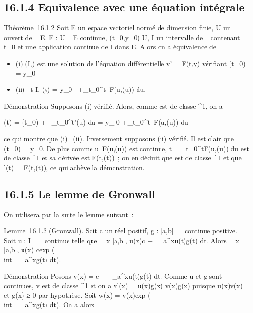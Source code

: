 \documentclass[]{article}
\begin{document}
\subsection{16.1.4 Equivalence avec une équation intégrale}

Théorème~16.1.2 Soit E un espace vectoriel normé de dimension finie, U
un ouvert de ~ \times E, F : U \rightarrow~ E continue, (t_0,y_0) \in U,
I un intervalle de ~ contenant t_0 et \phi une application
continue de I dans E. Alors on a équivalence de

\begin{itemize}
\itemsep1pt\parskip0pt
\item
  (i) (I,\phi) est une solution de l'équation différentielle y' = F(t,y)
  vérifiant \phi(t_0) = y_0
\item
  (ii) \forall~t \in I, \phi(t) = y_0~
  +\int  _t_0^t~F(u,\phi(u))
  du.
\end{itemize}

Démonstration Supposons (i) vérifié. Alors, comme \phi est de classe
^1, on a

\phi(t) = \phi(t_0) +\int ~
_t_0^t\phi'(u) du = y_ 0
+\int  _t_0^t~F(u,\phi(u))
du

ce qui montre que (i) \rigtharrow~(ii). Inversement supposons (ii) vérifié. Il est
clair que \phi(t_0) = y_0. De plus comme
u\mapsto~F(u,\phi(u)) est continue,
t\mapsto~\int ~
_t_0^tF(u,\phi(u)) du est de classe ^1
et sa dérivée est F(t,\phi(t))~; on en déduit que \phi est de classe
^1 et que \phi'(t) = F(t,\phi(t)), ce qui achève la démonstration.

\subsection{16.1.5 Le lemme de Gronwall}

On utilisera par la suite le lemme suivant~:

Lemme~16.1.3 (Gronwall). Soit c un réel positif, g : [a,b[\rightarrow~ ~
continue positive. Soit u : I \rightarrow~ ~ continue telle que
\forall~~x \in [a,b[, u(x)\leq c
+\int ~
_a^xu(t)g(t) dt. Alors
\forall~~x \in [a,b[, u(x)\leq
cexp (\\int ~
_a^xg(t) dt).

Démonstration Posons v(x) = c +\int ~
_a^xu(t)g(t) dt. Comme u et g sont
continues, v est de classe ^1 et on a v'(x) =
u(x)g(x) \leq v(x)g(x) puisque
u(x)\leq v(x) et g(x) ≥ 0 par hypothèse. Soit w(x) =
v(x)exp (-\\int ~
_a^xg(t) dt). On a alors
\end{document}
